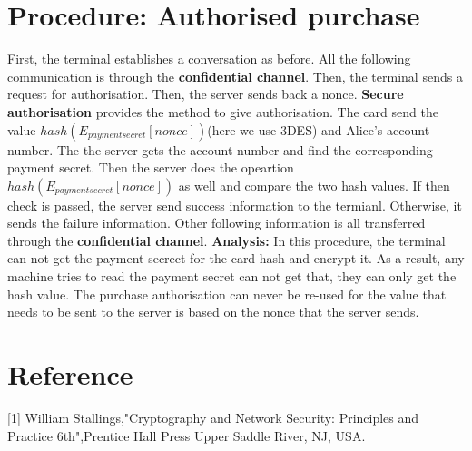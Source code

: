 \documentclass{article}
\begin{document}
    \section{Procedure: Authorised purchase}
First, the terminal establishes a conversation as before.
All the following communication is through the \textbf{confidential channel}.
Then, the terminal sends a request for authorisation.
Then, the server sends back a nonce. 
\textbf{Secure authorisation} provides the method to give authorisation. 
The card send the value $hash(E_{payment secret}[nonce])$(here we use 3DES) and Alice's account number.
The the server gets the account number and find the corresponding payment secret. 
Then the server does the opeartion $hash(E_{payment secret}[nonce])$ as well and compare the two hash values.
If then check is passed, the server send success information to the termianl. Otherwise, it sends the failure information. 
Other following information is all transferred through the \textbf{confidential channel}.
        \newline
\textbf{Analysis:}
In this procedure, the terminal can not get the payment secrect for the card hash and encrypt it. As a result, any machine tries to read the payment secret can not get that,
they can only get the hash value.
The purchase authorisation can never be re-used for the value that needs to be sent to the server is based on the nonce that the server sends.
    \section{Reference}
[1]  William Stallings,"Cryptography and Network Security: Principles and Practice 6th",Prentice Hall Press Upper Saddle River, NJ, USA.
\end{document}
